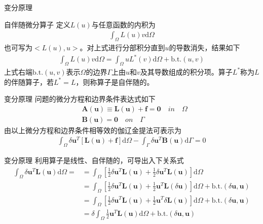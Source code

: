 \documentclass[11pt]{beamer}
\begin{document}
\begin{frame}{变分原理}
\begin{block}{自伴随微分算子}
定义$L(u)$与任意函数的内积为
\begin{align*}
\int_\Omega L(u)v\mathrm{d}\Omega
\end{align*}
也可写为$<L(u),u>$。对上式进行分部积分直到$u$的导数消失，结果如下
\begin{align*}
\int_\Omega L(u)v\mathrm{d}\Omega = \int_\Omega u L^*(v)\mathrm{d}\Omega+\mathrm{b.t.}(u,v)
\end{align*}
上式右端$\mathrm{b.t.}(u,v)$表示$\Omega$的边界$\Gamma$上由$u$和$v$及其导数组成的积分项。算子$L^*$称为$L$的伴随算子，若$L^*=L$，则称算子是自伴随的。
\end{block}
\end{frame}

\begin{frame}{变分原理}
问题的微分方程和边界条件表达式如下
\begin{align*}
&\textbf{A}(\textbf{u})\equiv \textbf{L}(\textbf{u})+\textbf{f}=\textbf{0}\quad in\quad\Omega\\
&\textbf{B}(\textbf{u})=\textbf{0}\quad on\quad \Gamma
\end{align*}
由以上微分方程和边界条件相等效的伽辽金提法可表示为
\begin{align*}
\int_\Omega \delta\textbf{u}^T[\textbf{L}(\textbf{u})+\textbf{f}]\mathrm{d}\Omega
-\int_\Gamma \delta{\textbf{u}}^T\textbf{B}(\textbf{u})\mathrm{d}\Gamma=0
\end{align*}
\end{frame}

\begin{frame}{变分原理}
利用算子是线性、自伴随的，可导出入下关系式
\begin{align*}
\int_\Omega \delta \textbf{u}^T \textbf{L}(\textbf{u}) \mathrm{d}\Omega =
&=\int_\Omega \left[ \frac{1}{2} \delta \textbf{u}^T\textbf{L}(\textbf{u})+
\frac{1}{2} \delta \textbf{u}^T \textbf{L}(\textbf{u}) \right] \mathrm{d}\Omega\\
&=\int_\Omega \left[ \frac{1}{2} \delta \textbf{u}^T\textbf{L}(\textbf{u})+
\frac{1}{2} \textbf{u}^T \textbf{L}( \delta \textbf{u}) \right] \mathrm{d}\Omega
+ \mathrm{b.t.}(\delta \textbf{u},\textbf{u})\\
&=\int_\Omega \left[ \frac{1}{2} \delta \textbf{u}^T\textbf{L}(\textbf{u})+
\frac{1}{2} \textbf{u}^T \delta \textbf{L}(  \textbf{u}) \right] \mathrm{d}\Omega
+ \mathrm{b.t.}(\delta \textbf{u},\textbf{u})\\
&=\delta \int_\Omega \frac{1}{2}\textbf{u}^T\textbf{L}(\textbf{u})\mathrm{d}\Omega
+ \mathrm{b.t.}(\delta \textbf{u},\textbf{u})\\
\end{align*}
\end{frame}
\end{document}
